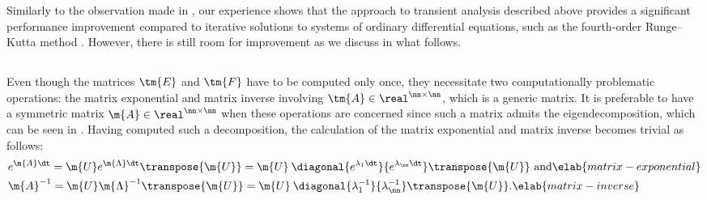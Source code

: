 Similarly to the observation made in \cite{thiele2011}, our experience shows
that the approach to transient analysis described above provides a significant
performance improvement compared to iterative solutions to systems of ordinary
differential equations, such as the fourth-order Runge--Kutta method
\cite{press2007}. However, there is still room for improvement as we discuss in
what follows.

\subsection{\solutiontitle}

Even though the matrices $\tm{E}$ and $\tm{F}$ have to be computed only once,
they necessitate two computationally problematic operations: the matrix
exponential and matrix inverse involving $\tm{A} \in \real^{\nn \times \nn}$,
which is a generic matrix. It is preferable to have a symmetric matrix $\m{A}
\in \real^{\nn \times \nn}$ when these operations are concerned since such a
matrix admits the eigendecomposition, which can be seen in
. Having computed such a decomposition, the calculation
of the matrix exponential and matrix inverse becomes trivial as follows:
\begin{align}
  & e^{\m{A} \dt}
  = \m{U} e^{\m{\Lambda} \dt} \transpose{\m{U}}
  = \m{U} \: \diagonal{e^{\lambda_1 \dt}}{e^{\lambda_\nn \dt}} \transpose{\m{U}} \text{ and} \elab{matrix-exponential} \\
  & \m{A}^{-1}
  = \m{U} \m{\Lambda}^{-1} \transpose{\m{U}}
  = \m{U} \: \diagonal{\lambda_1^{-1}}{\lambda_\nn^{-1}} \transpose{\m{U}}. \elab{matrix-inverse}
\end{align}


